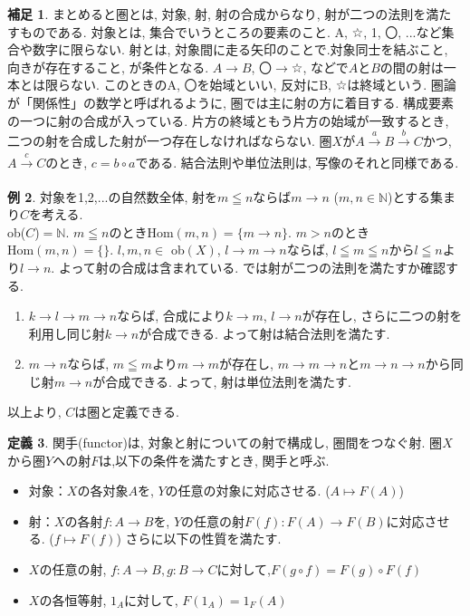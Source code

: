 \documentclass[a4paper]{jsarticle}
\theoremstyle{definition}
\newtheorem{dfn}{定義}[section]
\newtheorem{exam}[dfn]{例}
\newtheorem{hsk}[dfn]{補足}
\newcommand{\Hom}{{\mathrm{Hom}}}
\begin{document}
\begin{hsk}
まとめると圏とは, 対象, 射, 射の合成からなり, 射が二つの法則を満たすものである.
対象とは, 集合でいうところの要素のこと. A, ☆, 1, 〇, ...など集合や数字に限らない.
射とは, 対象間に走る矢印のことで.対象同士を結ぶこと, 向きが存在すること, が条件となる. $A \rightarrow B$, 〇$\rightarrow$☆, などで$A$と$B$の間の射は一本とは限らない. このときのA, 〇を始域といい, 反対にB, ☆は終域という. 圏論が「関係性」の数学と呼ばれるように, 圏では主に射の方に着目する. 構成要素の一つに射の合成が入っている. 片方の終域ともう片方の始域が一致するとき, 二つの射を合成した射が一つ存在しなければならない. 圏$X$が$A\xrightarrow[]{a} B\xrightarrow[]{b} C$かつ, $A\xrightarrow[]{c} C$のとき, $c=b\circ a$である. 結合法則や単位法則は, 写像のそれと同様である. 
\\
\end{hsk}

\begin{exam}
対象を1,2,...の自然数全体, 射を$m\leqq n$ならば$m \rightarrow n$ ($m, n \in \mathbb{N}$)とする集まり$C$を考える.\\ ob($C$)$= \mathbb{N}$. $m\leqq n$のとき$\Hom (m, n)=\{m\rightarrow n\}$. $m>n$のとき$\Hom (m, n)=\{\}$. $l, m, n\in$ ob$(X)$, $l \rightarrow m \rightarrow n$ならば, $l\leqq m\leqq n$から$l\leqq n$より$l \rightarrow n$. よって射の合成は含まれている. では射が二つの法則を満たすか確認する. 
 \begin{enumerate}[(1)]
        \item $k\rightarrow l\rightarrow m\rightarrow n$ならば, 合成により$k\rightarrow m$, $l \rightarrow n$が存在し, さらに二つの射を利用し同じ射$k\rightarrow n$が合成できる. よって射は結合法則を満たす.
        \item $m\rightarrow n$ならば, $m\leqq m$より$m\rightarrow m$が存在し, $m\rightarrow m\rightarrow n$と$m\rightarrow n\rightarrow n$から同じ射$m\rightarrow n$が合成できる. よって, 射は単位法則を満たす.\\
\end{enumerate}
以上より, $C$は圏と定義できる.
\end{exam}
\begin{dfn}
    関手(functor)は, 対象と射についての射で構成し, 圏間をつなぐ射. 圏$X$から圏$Y$への射$F$は,以下の条件を満たすとき, 関手と呼ぶ.
    \begin{itemize}
        \item 対象：$X$の各対象$A$を, $Y$の任意の対象に対応させる. ($A\longmapsto F(A)$)
        \item 射：$X$の各射$f:A\rightarrow B$を, $Y$の任意の射$F(f): F(A)\rightarrow F(B)$に対応させる. ($f\longmapsto F(f)$) さらに以下の性質を満たす.
    \end{itemize}
    \begin{itemize}
        \item[(1)] $X$の任意の射, $f:A\rightarrow B, g:B\rightarrow C$に対して,$F(g\circ f) = F(g)\circ F(f)$
        \item[(2)] $X$の各恒等射, $1_A$に対して, $F(1_A) = 1_F(A)$
    \end{itemize}
    
\end{dfn}
\end{document}
